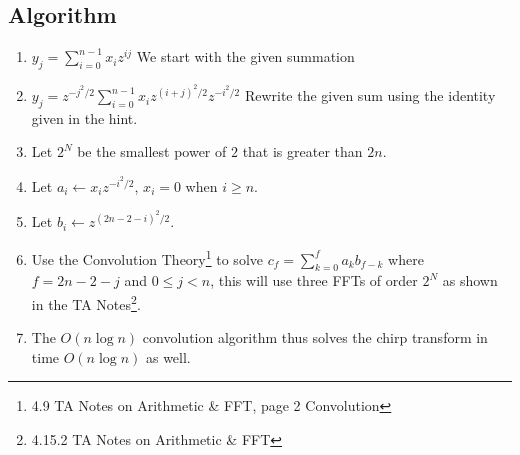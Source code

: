 \documentclass{article}
\begin{document}
\subsection{Algorithm}
\begin{enumerate}
      \item \(y_j = \sum_{i=0}^{n-1}x_i z^{ij} \) We start with the given summation
      \item \(y_j = z^{-j^2/2} \sum_{i=0}^{n-1}x_i z^{{(i+j)}^2 /2} z^{-i^2 /2}\) Rewrite
            the given sum using the identity given in the hint.
      \item Let \(2^N\) be the smallest power of \(2\) that is greater than \(2n\).
      \item Let \(a_i \leftarrow x_i z^{-i^2 /2}\), \(x_i = 0\) when \(i \geq n\).
      \item Let \(b_i \leftarrow z^{{(2n-2-i)}^2 /2}\).
      \item Use the Convolution Theory\footnote{4.9 TA Notes on Arithmetic \& FFT, page 2 Convolution} to
            solve \(c_f = \sum_{k=0}^{f} a_k b_{f-k}\) where \(f=2n-2-j\) and \(0 \leq j
            < n\), this will use three FFTs of order \(2^N\) as shown in the TA
            Notes\footnote{4.15.2 TA Notes on Arithmetic \& FFT}.
      \item The \(O(n\log{n})\) convolution algorithm thus solves the chirp transform in
            time \(O(n\log{n})\) as well.
\end{enumerate}
\end{document}
